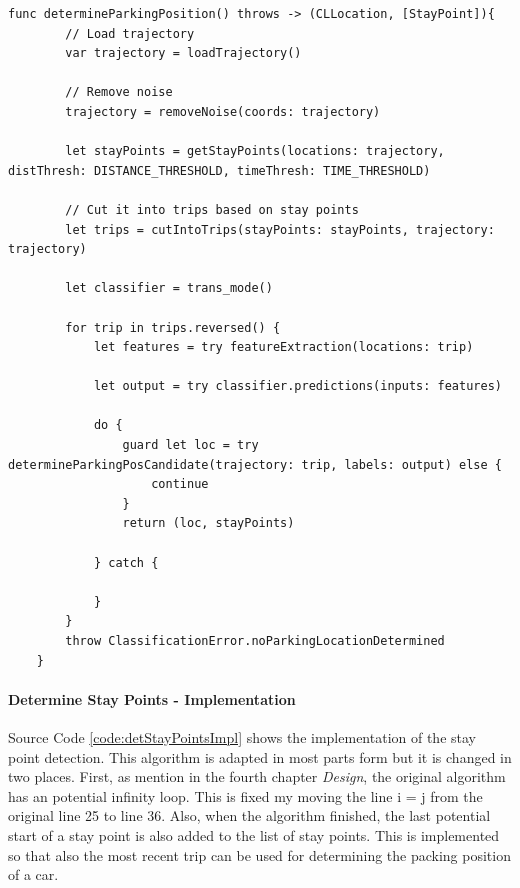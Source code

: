 \begin{lstlisting}[style=swift, caption={Determine Parking Position Algorithm Implementation}, label={code:detParkPosImpl}]
func determineParkingPosition() throws -> (CLLocation, [StayPoint]){
        // Load trajectory
        var trajectory = loadTrajectory()
        
        // Remove noise
        trajectory = removeNoise(coords: trajectory)
        
        let stayPoints = getStayPoints(locations: trajectory, distThresh: DISTANCE_THRESHOLD, timeThresh: TIME_THRESHOLD)
        
        // Cut it into trips based on stay points
        let trips = cutIntoTrips(stayPoints: stayPoints, trajectory: trajectory)
        
        let classifier = trans_mode()
        
        for trip in trips.reversed() {
            let features = try featureExtraction(locations: trip)
            
            let output = try classifier.predictions(inputs: features)
            
            do {
                guard let loc = try determineParkingPosCandidate(trajectory: trip, labels: output) else {
                    continue
                }
                return (loc, stayPoints)
                
            } catch {
            
            }
        }
        throw ClassificationError.noParkingLocationDetermined
    }
\end{lstlisting}

\paragraph{Determine Stay Points - Implementation}
Source Code \ref{code:detStayPointsImpl} shows the implementation of the stay point detection. This algorithm is adapted in most parts form \cite{li2008mining} but it is changed in two places. First, as mention in the fourth chapter \textit{Design}, the original algorithm has an potential infinity loop. This is fixed my moving the line i = j from the original line 25 to line 36. Also, when the algorithm finished, the last potential start of a stay point is also added to the list of stay points. This is implemented so that also the most recent trip can be used for determining the packing position of a car. 

